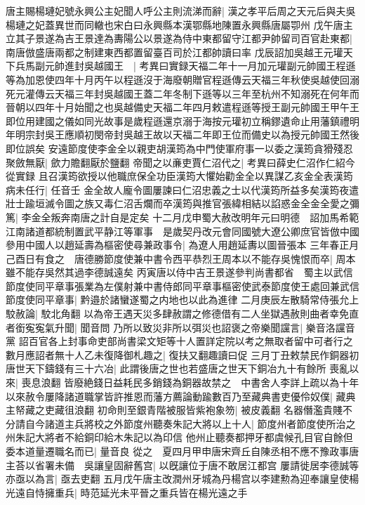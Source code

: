 唐主賜楊璉妃號永興公主妃聞人呼公主則流涕而辭|{
	漢之孝平后周之天元后與夫吳楊璉之妃蓋異世而同轍也宋白曰永興縣本漢鄂縣地陳置永興縣唐屬卾州}
戊午唐主立其子景遂為吉王景達為夀陽公以景遂為侍中東都留守江都尹帥留司百官赴東都|{
	南唐倣盛唐兩都之制建東西都置留臺百司於江都帥讀曰率}
戊辰詔加吳越王元瓘天下兵馬副元帥進封吳越國王　|{
	考異曰實録天福二年十一月加元瓘副元帥國王程遜等為加恩使四年十月丙午以程遜沒于海廢朝贈官程遜傳云天福三年秋使吳越使回溺死元灌傳云天福三年封吳越國王蓋二年冬制下遜等以三年至杭州不知溺死在何年而晉朝以四年十月始聞之也吳越備史天福二年四月敕遣程遜等授王副元帥國王甲午王即位用建國之儀如同光故事是歲程遜還京溺于海按元瓘初立稱鏐遺命止用藩鎮禮明年明宗封吳王應順初閔帝封吳越王故以天福二年即王位而備史以為授元帥國王然後即位誤矣}
安遠節度使李金全以親吏胡漢筠為中門使軍府事一以委之漢筠貪猾殘忍聚斂無厭|{
	歛力贍翻厭於鹽翻}
帝聞之以亷吏賈仁沼代之|{
	考異曰薛史仁沼作仁紹今從實録}
且召漢筠欲授以他職庶保全功臣漢筠大懼始勸金全以異謀乙亥金全表漢筠病未任行|{
	任音壬}
金全故人龐令圖屢諫曰仁沼忠義之士以代漢筠所益多矣漢筠夜遣壯士踰垣滅令圖之族又毒仁沼舌爛而卒漢筠與推官張緯相結以諂惑金全金全愛之彌篤|{
	李金全叛奔南唐之計自是定矣}
十二月戊申蜀大赦改明年元曰明德　詔加馬希範江南諸道都統制置武平静江等軍事　是歲契丹改元會同國號大遼公卿庶官皆倣中國參用中國人以趙延壽為樞密使尋兼政事令|{
	為遼人用趙延夀以圖晉張本}
三年春正月己酉日有食之　唐德勝節度使兼中書令西平恭烈王周本以不能存吳愧恨而卒|{
	周本雖不能存吳然其過李德誠遠矣}
丙寅唐以侍中吉王景遂參判尚書都省　蜀主以武信節度使同平章事張業為左僕射兼中書侍郎同平章事樞密使武泰節度使王處回兼武信節度使同平章事|{
	黔邉於諸蠻遂蜀之内地也以此為進律}
二月庚辰左散騎常侍張允上駮赦論|{
	駮北角翻}
以為帝王遇天災多肆赦謂之修德借有二人坐獄遇赦則曲者幸免直者銜寃寃氣升聞|{
	聞音問}
乃所以致災非所以弭災也詔褒之帝樂聞讜言|{
	樂音洛讜音黨}
詔百官各上封事命吏部尚書梁文矩等十人置詳定院以考之無取者留中可者行之數月應詔者無十人乙未復降御札趣之|{
	復扶又翻趣讀曰促}
三月丁丑敕禁民作銅器初唐世天下鑄錢有三十六冶|{
	此謂後唐之世也若盛唐之世天下銅冶九十有餘所}
喪亂以來|{
	喪息浪翻}
皆廢絶錢日益耗民多銷錢為銅器故禁之　中書舍人李詳上疏以為十年以來赦令屢降諸道職掌皆許推恩而藩方薦論動踰數百乃至藏典書吏優伶奴僕|{
	藏典主帑藏之吏藏徂浪翻}
初命則至銀青階被服皆紫袍象笏|{
	被皮義翻}
名器僭濫貴賤不分請自今諸道主兵將校之外節度州聽奏朱記大將以上十人|{
	節度州者節度使所治之州朱記大將者不給銅印給木朱記以為印信}
他州止聽奏都押牙都虞候孔目官自餘但委本道量遷職名而已|{
	量音良}
從之　夏四月甲申唐宋齊丘自陳丞相不應不豫政事唐主荅以省署未備　吳讓皇固辭舊宫|{
	以旣讓位于唐不敢居江都宫}
屢請徙居李德誠等亦亟以為言|{
	亟去吏翻}
五月戊午唐主改潤州牙城為丹楊宫以李建勲為迎奉讓皇使楊光遠自恃擁重兵|{
	時范延光未平晉之重兵皆在楊光遠之手}
